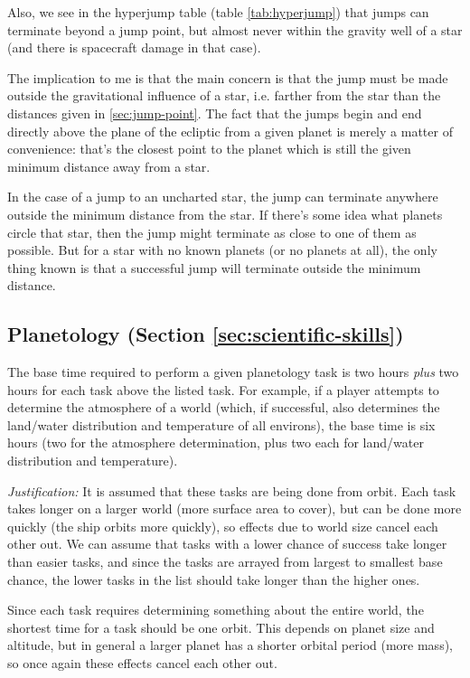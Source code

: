 Also, we see in the hyperjump table (table \ref{tab:hyperjump}) that
jumps can terminate beyond a jump point, but almost never within the
gravity well of a star (and there is spacecraft damage in that case).

The implication to me is that the main concern is that the jump must
be made outside the gravitational influence of a star, i.e. farther
from the star than the distances given in \ref{sec:jump-point}.  The
fact that the jumps begin and end directly above the plane of the
ecliptic from a given planet is merely a matter of convenience: that's
the closest point to the planet which is still the given minimum
distance away from a star.

In the case of a jump to an uncharted star, the jump can terminate
anywhere outside the minimum distance from the star.  If there's some
idea what planets circle that star, then the jump might terminate as
close to one of them as possible.  But for a star with no known
planets (or no planets at all), the only thing known is that a
successful jump will terminate outside the minimum distance.


\subsection{Planetology (Section \ref{sec:scientific-skills})}
\label{sec:planetology}

The base time required to perform a given planetology task is two
hours \emph{plus} two hours for each task above the listed task.  For
example, if a player attempts to determine the atmosphere of a world
(which, if successful, also determines the land/water distribution and
temperature of all environs), the base time is six hours (two for the
atmosphere determination, plus two each for land/water distribution
and temperature).


\emph{Justification:} It is assumed that these tasks are being done
from orbit.  Each task takes longer on a larger world (more
surface area to cover), but can be done more quickly (the ship orbits
more quickly), so effects due to  world size cancel each other out.
We can assume that tasks with a lower chance of success take longer
than easier tasks, and since the tasks are arrayed from largest to
smallest base chance, the lower tasks in the list should take longer
than the higher ones.

Since each task requires determining something about the entire world,
the shortest time for a task should be one orbit.  This depends on
planet size and altitude, but in general a larger planet has a shorter
orbital period (more mass), so once again these effects cancel each
other out.

